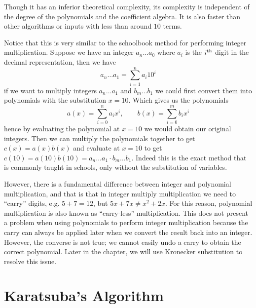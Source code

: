 Though it has an inferior theoretical complexity, its complexity is independent of the degree of the polynomials and the coefficient algebra. It is also faster than other algorithms or inputs with less than around $10$ terms.

Notice that this is very similar to the schoolbook method for performing integer multiplication. Suppose we have an integer $a_n \ldots a_0$ where $a_i$ is the $i^\textrm{th}$ digit in the decimal representation, then we have
\[
    a_n \ldots a_1 = \sum^n_{i=1} a_i 10^i
\]
if we want to multiply integers $a_n\ldots a_1$ and $b_m\ldots b_1$ we could first convert them into polynomials with the substitution $x = 10$. Which gives us the polynomials
\[
    a(x) = \sum^n_{i=0} a_ix^i, \qquad b(x) = \sum^m_{i=0} b_ix^i
\]
hence by evaluating the polynomial at $x = 10$ we would obtain our original integers. Then we can multiply the polynomials together to get $c(x) = a(x)b(x)$ and evaluate at $x = 10$ to get $c(10) = a(10)b(10) = a_n\ldots a_1 \cdot b_m\ldots b_1$. Indeed this is the exact method that is commonly taught in schools, only without the substitution of variables.

However, there is a fundamental difference between integer and polynomial multiplication, and that is that in integer multiply multiplication we need to ``carry'' digits, e.g. $5 + 7 = 12$, but $5x + 7x \neq x^2 + 2x$. For this reason, polynomial multiplication is also known as ``carry-less'' multiplication. This does not present a problem when using polynomials to perform integer multiplication because the carry can always be applied later when we convert the result back into an integer. However, the converse is not true; we cannot easily undo a carry to obtain the correct polynomial. Later in the chapter, we will use Kronecker substitution to resolve this issue.

\section{Karatsuba's Algorithm}
\label{sec:prelim-karatsuba}


